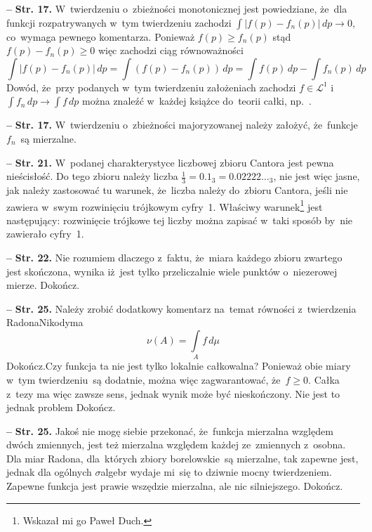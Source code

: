 \documentclass[a4paper,11pt]{article}
\newcommand{\ld}{\ldots}
\newcommand{\fr}{\frac}
\newcommand{\mc}{\mathcal}
\newcommand{\ra}{\rightarrow}
\newcommand{\si}{\sigma}
\newcommand{\Lc}{\mc{L}}
\newcommand{\dk}{\, d} %
\newcommand{\Int}{\int\limits}
\newcommand{\IntSet}[3]{\Int_{ #1 } #2 \, d#3} %
\newcommand{\IntCaD}[2] { \Int #1 \, d#2 } %
\newcommand{\LIj}{\Lc^{ 1 }}
\newcommand{\tb}{\textbf}
\newcommand{\noi}{\noindent}
\newcommand{\start}{\noi \tb{--} {}}
\newcommand{\Str}[1]{\tb{Str. #1.}}
\newcommand{\Dok}{{\color{red} Dokończ.}}
\begin{document}
\start \Str{17} W~twierdzeniu o~zbieżności monotonicznej jest
powiedziane, że~dla funkcji rozpatrywanych w~tym twierdzeniu zachodzi
$\int | f( p ) - f_{ n }( p ) | \dk p \ra 0$, co~wymaga pewnego
komentarza. Ponieważ $f( p ) \geq f_{ n }( p )$ stąd
$f( p ) - f_{ n }( p ) \geq 0$ więc zachodzi ciąg równoważności
\begin{displaymath}
  \IntCaD{ | f( p ) - f_{ n }( p ) | }{ p } = \IntCaD{ ( f( p )
    - f_{ n }( p ) ) }{ p } = \IntCaD{ f( p ) }{ p }
  - \IntCaD{ f_{ n }( p ) }{ p }
\end{displaymath}
Dowód, że~przy podanych w~tym twierdzeniu założeniach zachodzi
$f \in \LIj$ i~$\IntCaD{ f_{ n } }{ p } \ra \IntCaD{ f }{ p }$ można
znaleźć w~każdej książce do~teorii całki, np.~\cite{Rudin98}. %


\start \Str{17} W~twierdzeniu o~zbieżności majoryzowanej należy
założyć, że~funkcje $f_{ n }$~są mierzalne. %


\start \Str{21} W~podanej charakterystyce liczbowej zbioru Cantora
jest pewna nieścisłość. Do tego zbioru należy liczba
$\fr{ 1 }{ 3 } = 0.1_{ 3 } = 0.02222\ld_{ 3 }$, nie jest więc jasne,
jak należy zastosować tu warunek, że~liczba należy do~zbioru Cantora,
jeśli nie zawiera w~swym rozwinięciu trójkowym cyfry~1. Właściwy
warunek\footnote{Wskazał mi go Paweł Duch.} jest następujący:
rozwinięcie trójkowe tej liczby można zapisać w~taki sposób by~nie
zawierało cyfry~1. %


\start \Str{22} Nie rozumiem dlaczego z~faktu, że~miara każdego zbioru
zwartego jest skończona, wynika iż~jest tylko przeliczalnie wiele
punktów o~niezerowej mierze. \Dok


\start \Str{25} Należy zrobić dodatkowy komentarz na~temat równości
z~twierdzenia Radona\dywiz Nikodyma
\begin{equation}
  \label{eq:2}
  \nu( A ) = \IntSet{ A }{ f }{ \mu }
\end{equation}
\Dok Czy funkcja ta nie jest tylko lokalnie całkowalna? Ponieważ obie
miary w~tym twierdzeniu~są dodatnie, można więc zagwarantować,
że~$f \geq 0$. Całka z~tezy ma więc zawsze sens, jednak wynik może być
nieskończony. Nie jest to jednak problem \Dok


\start \Str{25} Jakoś nie mogę siebie przekonać, że~funkcja mierzalna
względem dwóch zmiennych, jest też mierzalna względem każdej
ze~zmiennych z~osobna. Dla miar Radona, dla~których zbiory
borelowskie~są mierzalne, tak zapewne jest, jednak dla ogólnych
$\si$\dywiz algebr wydaje mi~się to dziwnie mocny twierdzeniem.
Zapewne funkcja jest prawie wszędzie mierzalna, ale nic silniejszego.
\Dok
\end{document}
